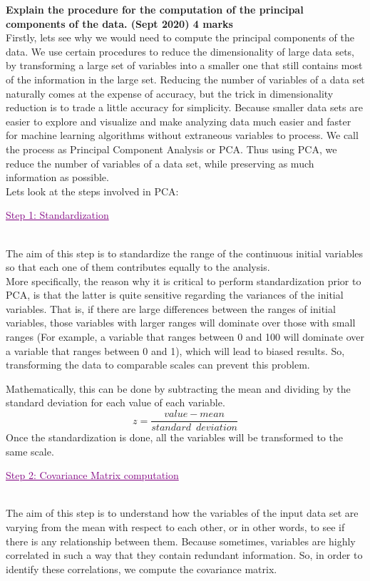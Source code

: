 
\textbf{\textcolor{LightMagenta}{Explain the procedure for the computation of the principal components of the data. (Sept 2020)  \hfill 4 marks}} \\[5pt]
Firstly, lets see why we would need to compute the principal components of the data. We use certain procedures to reduce the dimensionality of large data sets, by transforming a large set of variables into a smaller one that still contains most of the information in the large set. Reducing the number of variables of a data set naturally comes at the expense of accuracy, but the trick in dimensionality reduction is to trade a little accuracy for simplicity. Because smaller data sets are easier to explore and visualize and make analyzing data much easier and faster for machine learning algorithms without extraneous variables to process. We call the process as Principal Component Analysis or PCA. Thus using PCA, we reduce the number of variables of a data set, while preserving as much information as possible.\\[0.4 cm]
Lets look at the steps involved in PCA:\\[0.2 cm]
\textcolor{purple}{\centerline{\underline{{ Step 1: Standardization }}}}\\[0.2 cm]
The aim of this step is to standardize the range of the continuous initial variables so that each one of them contributes equally to the analysis.\\
More specifically, the reason why it is critical to perform standardization prior to PCA, is that the latter is quite sensitive regarding the variances of the initial variables. That is, if there are large differences between the ranges of initial variables, those variables with larger ranges will dominate over those with small ranges (For example, a variable that ranges between 0 and 100 will dominate over a variable that ranges between 0 and 1), which will lead to biased results. So, transforming the data to comparable scales can prevent this problem.

Mathematically, this can be done by subtracting the mean and dividing by the standard deviation for each value of each variable.
\\  
\begin{equation*}
        z = \frac{value - mean}{standard\;\:deviation}
\end{equation*}
Once the standardization is done, all the variables will be transformed to the same scale.\\[0.2 cm]
\textcolor{purple}{\centerline{\underline{{ Step 2: Covariance Matrix computation }}}}\\[0.2 cm]
The aim of this step is to understand how the variables of the input data set are varying from the mean with respect to each other, or in other words, to see if there is any relationship between them. Because sometimes, variables are highly correlated in such a way that they contain redundant information. So, in order to identify these correlations, we compute the covariance matrix.

